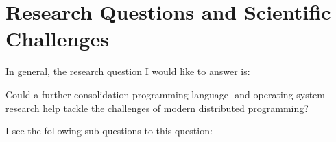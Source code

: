 \section{Research Questions and Scientific Challenges}
\label{sec:research-questions-and-scientific-challenges}

In general, the research question I would like to answer is:

\begin{center}

Could a further consolidation programming language- and operating
system research help tackle the challenges of modern distributed
programming?

\end{center}

\noindent I see the following sub-questions to this question:

